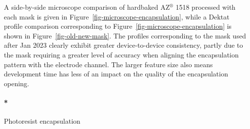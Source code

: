 \documentclass[
  letterpaper,
  DIV=11,
  numbers=noendperiod]{scrartcl}
\let\oldparagraph\paragraph
\renewcommand{\paragraph}[1]{\oldparagraph{#1}\mbox{}}
\begin{document}
A side-by-side microscope comparison of hardbaked AZ\(^\circledR\) 1518
processed with each mask is given in
Figure~\ref{fig-microscope-encapsulation}, while a Dektat profile
comparison corresponding to Figure~\ref{fig-microscope-encapsulation} is
shown in Figure~\ref{fig-old-new-mask}. The profiles corresponding to
the mask used after Jan 2023 clearly exhibit greater device-to-device
consistency, partly due to the mask requiring a greater level of
accuracy when aligning the encapsulation pattern with the electrode
channel. The larger feature size also means development time has less of
an impact on the quality of the encapsulation opening.

\hypertarget{photoresist-encapsulation}{%
\paragraph*{Photoresist encapsulation}\label{photoresist-encapsulation}}
\end{document}
